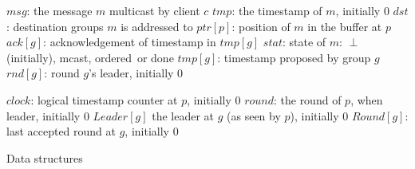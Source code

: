 
\newcommand{\rdwrite}[3]{WRITE\ensuremath{(@#1\!\rightarrow\!#2, #3)}}	%
\newcommand{\band}{\textbf{and}}
\newcommand{\mcast}{\textsf{mcast}}
\newcommand{\ack}{\textsf{ack}}
\newcommand{\ordered}{\textsf{ordered}}
\newcommand{\done}{\textsf{done}}
\newcommand{\myack}{\textsf{ack}}

\begin{algorithm}
\footnotesize

\begin{distribalgo}[1]

\vspace{1.0mm}
	\STATE $msg$: the message $m$ multicast by client $c$
	\STATE $tmp$: the timestamp of $m$, initially 0
	\STATE $dst$: destination groups $m$ is addressed to
	\STATE $ptr[p]$: position of $m$ in the buffer at $p$
	\STATE $ack[g]$: acknowledgement of timestamp in $tmp[g]$
	\STATE $stat$: state of $m$: $\perp$ (initially), \mcast, \ordered\ or \done
\ENDINDENT
\vspace{1.0mm}
	\STATE $tmp[g]$: timestamp proposed by group $g$
	\STATE $rnd[g]$: round $g$'s leader, initially 0
\ENDINDENT
\vspace{1.0mm}
\vspace{1.0mm}

	\STATE $clock$: logical timestamp counter at $p$, initially 0
	\STATE $round$: the round of $p$, when leader, initially 0
	\STATE $Leader[g]$ the leader at $g$ (as seen by $p$), initially 0
	\STATE $Round[g]$: last accepted round at $g$, initially 0
\ENDINDENT
\vspace{1.0mm}
\caption{Data structures}
\label{alg:data_struct}
\end{distribalgo}
\end{algorithm}

